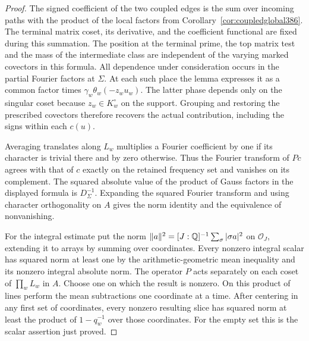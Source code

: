 \documentclass[a4paper,11pt]{article}
\theoremstyle{definition}
\theoremstyle{remark}
\numberwithin{equation}{section}
\begin{document}
\begin{proof}
The signed coefficient of the two coupled edges is the sum
over incoming paths with the product of the local factors
from Corollary~\ref{cor:coupledglobal386}. The terminal matrix
coset, its derivative, and the coefficient functional are
fixed during this summation. The position at the terminal prime,
the top matrix test and the mass of the intermediate class
are independent of the varying marked covectors in this
formula. All dependence under consideration occurs in the
partial Fourier factors at \(\Sigma\). At each such place
the lemma expresses it as a common factor times
\(\gamma_w\theta_w(-z_wu_w)\). The latter phase depends only
on the singular coset because \(z_w\in K_w^\circ\) on the
support. Grouping and restoring the prescribed covectors
therefore recovers the actual contribution, including the
signs within each \(c(u)\).

Averaging translates along \(L_w\) multiplies a Fourier
coefficient by one if its character is trivial there and
by zero otherwise. Thus the Fourier transform of \(Pc\)
agrees with that of \(c\) exactly on the retained frequency
set and vanishes on its complement. The squared absolute
value of the product of Gauss factors in the displayed
formula is \(D_\Sigma^{-1}\). Expanding the squared Fourier
transform and using character orthogonality on \(A\) gives
the norm identity and the equivalence of nonvanishing.

For the integral estimate put the norm
\(\|a\|^2=[J:\mathbb Q]^{-1}\sum_\sigma|\sigma a|^2\) on
\(\mathcal O_J\), extending it to arrays by summing over
coordinates. Every nonzero integral scalar has squared norm
at least one by the arithmetic-geometric mean inequality
and its nonzero integral absolute norm. The operator \(P\)
acts separately on each coset of \(\prod_w L_w\) in \(A\).
Choose one on which the result is nonzero. On this product
of lines perform the mean subtractions one coordinate at
a time. After centering in any first set of coordinates,
every nonzero resulting slice has squared norm at least
the product of \(1-q_w^{-1}\) over those coordinates.
For the empty set this is the scalar assertion just proved.


\end{proof}
\end{document}
